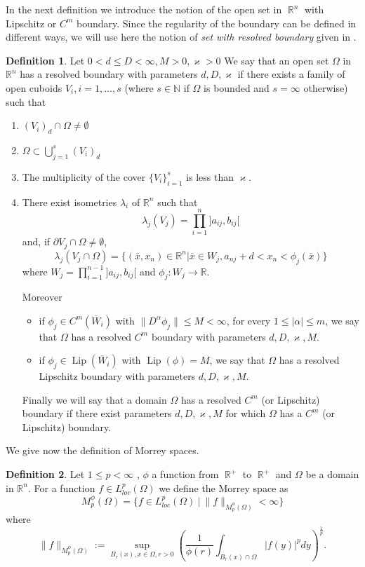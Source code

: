 \documentclass[12pt]{article}
\theoremstyle{definition}
\newtheorem{definition}{Definition}
\DeclareMathOperator\Lip{Lip}
\DeclareMathOperator\rr{\mathbb{R}}
\begin{document}
In the next definition we introduce the notion of the open set in $\rr^n$ with Lipschitz or $C^m$ boundary. Since the regularity of the boundary can be defined in different ways, we will use here the notion of \textit{set with resolved boundary} given in \cite[Section 4.3]{burenkov}.
\begin{definition}\label{resolved boundary}
Let $0<d\le D <\infty, M>0, \varkappa>0$ We say that an open set $\Omega$ in $\mathbb{R}^n$ has a resolved boundary with parameters $d,D, \varkappa$ if there exists a family of open cuboids $V_i , i=1,...,s$ (where $s \in \mathbb{N}$ if $\Omega$ is bounded and $s=\infty$ otherwise) such that
\begin{enumerate}
\item $(V_i)_d \cap \Omega \neq \emptyset$
\item $\Omega \subset \bigcup\limits_{j=1}^s (V_i)_d$
\item The multiplicity of the cover $\{ V_i\}_{i=1}^s$ is less than $ \varkappa$.
\item There exist isometries $\lambda_i$ of $\mathbb{R}^n$ such that
\[   \lambda_j(V_j)= \prod_{i=1}^n ]a_{ij},b_{ij}[\]
and, if $\partial V_j \cap \Omega \neq \emptyset$,
\[ \lambda_j(V_j\cap \Omega)= \{ (\overline x, x_n) \in \mathbb{R}^n  |  \overline x \in W_j , a_{nj}+d<x_n<\phi_j(\overline x)\} \]
where $W_j=\prod\limits_{i=1}^{n-1} ]a_{ij},b_{ij}[$ and $\phi_j : W_j \rightarrow \mathbb{R}$.

Moreover
\begin{itemize}
\item if $\phi_j \in C^m(\overline W_i)$ with  $\| D^{\alpha}\phi_j \|\le M <\infty $, for every $1\le|\alpha|\le m$, we say that $\Omega$  has a resolved $C^m$ boundary with parameters $d,D, \varkappa,M$.
\item if $\phi_j \in \Lip(\overline W_i)$ with  $\Lip(\phi)= M$,  we say that $\Omega$  has a resolved Lipschitz boundary with parameters $d,D, \varkappa,M$.
\end{itemize}
Finally we will say that a domain $\Omega$ has a resolved $C^m$ (or Lipschitz) boundary if there exist parameters $d,D,\varkappa,M$ for which $\Omega$ has a $C^m$ (or Lipschitz) boundary.
\end{enumerate}




\end{definition}
We give now the definition of Morrey spaces.
\begin{definition}\label{morreydef}
Let $1\le p< \infty$ , $\phi$ a function from $\rr^+$ to $\rr^+$ and $\Omega$ be a domain in $\mathbb{R}^n$. For a function $f \in L^p_{loc}(\Omega)$ we define the Morrey space as
\[ M_p^\phi(\Omega)=\{f \in  L^p_{loc}(\Omega) \ |\  \|f\|_{M_p^\phi(\Omega)}<\infty\}\]
where
\[ \|f\|_{M_p^\phi(\Omega)}:=\sup_{B_r(x), x \in \Omega,r>0} \left(  \frac{1}{\phi(r)}\int_{B_r(x)\cap \Omega} |f(y)|^p dy \right )^{\frac{1}{p}}.\]
\end{definition}
\end{document}
